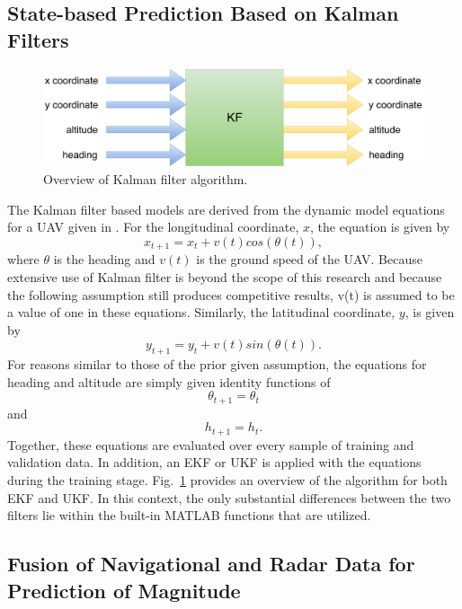 \documentclass[12pt]{uthesis-v12}  %
\begin{document}
\subsection{State-based Prediction Based on Kalman Filters}
\label{sec-kf}

\begin{figure}[!t]
\centering
\includegraphics[width=5in]{kf-fig}
\caption{Overview of Kalman filter algorithm.}
\label{kf-fig}
\end{figure}

The Kalman filter based models are derived from the dynamic model equations for a UAV given in \cite{mao}. For the longitudinal coordinate, $x$, the equation is given by
\begin{equation}
x_{t+1} = x_t + v(t) cos(\theta(t)),
\end{equation}
where $\theta$ is the heading and $v(t)$ is the ground speed of the UAV. Because extensive use of Kalman filter is beyond the scope of this research and because the following assumption still produces competitive results, v(t) is assumed to be a value of one in these equations. Similarly, the latitudinal coordinate, $y$, is given by
\begin{equation}
y_{t+1} = y_t + v(t) sin(\theta(t)).
\end{equation}
For reasons similar to those of the prior given assumption, the equations for heading and altitude are simply given identity functions of
\begin{equation}
\theta_{t+1} = \theta_t
\end{equation}
and
\begin{equation}
h_{t+1} = h_t.
\end{equation}
Together, these equations are evaluated over every sample of training and validation data. In addition, an EKF or UKF is applied with the equations during the training stage. Fig.~\ref{kf-fig} provides an overview of the algorithm for both EKF and UKF. In this context, the only substantial differences between the two filters lie within the built-in MATLAB functions that are utilized.

\subsection{Fusion of Navigational and Radar Data for Prediction of Magnitude}
\label{fusion}
\end{document}
